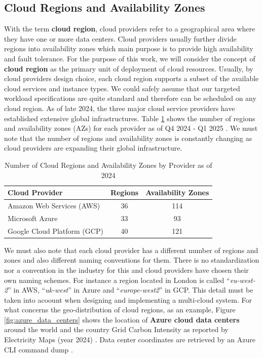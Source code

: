 \subsection{Cloud Regions and Availability Zones}

With the term \textbf{cloud region}, cloud providers refer to a geographical area where they have one or more data centers.
Cloud providers usually further divide regions into availability zones which main purpose is to provide high availability and fault tolerance.
For the purpose of this work, we will consider the concept of \textbf{cloud region} as the primary unit of deployment of cloud resources.
Usually, by cloud providers design choice, each cloud region supports a subset of the available cloud services and instance types.
We could safely assume that our targeted workload specifications are quite standard and therefore can be scheduled on any cloud region.
As of late 2024, the three major cloud service providers have established extensive global infrastructures.
Table \ref{tab:cloud_regions_azs} shows the number of regions and availability zones (AZs) for each provider as of Q4 2024 - Q1 2025
\cite{statista_cloud_regions} \cite{aws_infrastructure}.
We must note that the number of regions and availability zones is constantly changing as cloud providers are expanding their global infrastructure.

\begin{table}[H]
    \centering
    \begin{tabular}{|l|c|c|}
    \hline
    \textbf{Cloud Provider} & \textbf{Regions} & \textbf{Availability Zones} \\
    \hline
    Amazon Web Services (AWS) & 36 & 114 \\
    \hline
    Microsoft Azure & 33 & 93 \\
    \hline
    Google Cloud Platform (GCP) & 40 & 121 \\
    \hline
    \end{tabular}
    \caption{Number of Cloud Regions and Availability Zones by Provider as of 2024 \cite{stat}}
    \label{tab:cloud_regions_azs}
\end{table}

We must also note that each cloud provider has a different number of regions and zones and also different naming conventions for them.
There is no standardization nor a convention in the industry for this and cloud providers have chosen their own naming schemes.
For instance a region located in London is called ``\textit{eu-west-2}'' in AWS, ``\textit{uk-west}'' in Azure and ``\textit{europe-west2}'' in GCP.
This detail must be taken into acoount when designing and implementing a multi-cloud system.
For what concerns the geo-distribution of cloud regions, as an example, Figure \ref{fig:azure_data_centers} shows the location of \textbf{Azure cloud data centers} around the world and the country Grid Carbon Intensity as reported by Electricity Maps (year 2024) \cite{electricity_maps}.
Data center coordinates are retrieved by an Azure CLI command dump \cite{azure_data_centers_information}.

